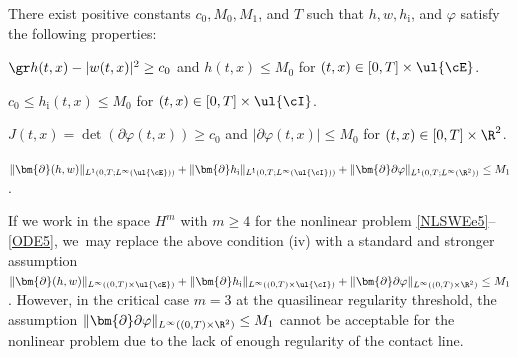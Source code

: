 \begin{assumption}\label{ass:LP}
There exist positive constants $c_0, M_0,M_1$, and $T$ such that $h,w,h_\mathrm{i}$, and $\varphi$ satisfy the following properties:
\begin{enumeratei}
\item\label{ass:LPi}
$\gr h(t,x)-|w(t,x)|^2\geq c_0$ and $h(t,x)\leq M_0$ for $(t,x)\in[0,T]\times\ul{\cE}$.
\item\label{ass:LPii}
$c_0 \leq h_\mathrm{i}(t,x) \leq M_0$ for $(t,x)\in[0,T]\times\ul{\cI}$.
\item\label{ass:LPiii}
$J(t,x)=\det(\partial\varphi(t,x))\geq c_0$ and $|\partial\varphi(t,x)|\leq M_0$ for $(t,x)\in[0,T]\times\R^2$.
\item\label{ass:LPiv}
$\|\bm{\partial}(h,w)\|_{L^1(0,T;L^\infty(\ul{\cE}))} + \|\bm{\partial} h_\mathrm{i}\|_{L^1(0,T;L^\infty(\ul{\cI}))}
+ \|\bm{\partial}\partial\varphi\|_{L^1(0,T;L^\infty(\R^2))} \leq M_1$.
\end{enumeratei}
\end{assumption}

\begin{remark}
If we work in the space $H^m$ with $m\geq4$ for the nonlinear problem \eqref{NLSWEe5}--\eqref{ODE5}, we~may replace the above condition {\rm (iv)}
with a standard and stronger assumption $\|\bm{\partial}(h,w)\|_{L^\infty((0,T)\times\ul{\cE})} + \|\bm{\partial} h_\mathrm{i}\|_{L^\infty((0,T)\times\ul{\cI})}
+ \|\bm{\partial}\partial\varphi\|_{L^\infty((0,T)\times\R^2)} \leq M_1$.
However, in the critical case $m=3$ at the quasilinear regularity threshold, the assumption $\|\bm{\partial}\partial\varphi\|_{L^\infty((0,T)\times\R^2)} \leq M_1$
cannot be acceptable for the nonlinear problem due to the lack of enough regularity of the contact line.
\end{remark}

